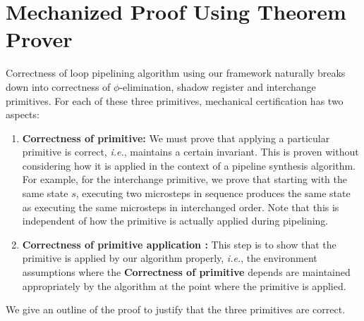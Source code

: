 \section{Mechanized Proof Using Theorem Prover}
\label{sec:proof}

Correctness of loop pipelining algorithm using our framework naturally breaks
down into correctness of $\phi$-elimination, shadow register and interchange primitives. For each of these three primitives, mechanical certification has two aspects:

\begin{enumerate}
\item {\bf Correctness of primitive:} We must prove that
  applying a particular primitive is correct, {\em i.e.},
  maintains a certain invariant.  This is proven without
  considering how it is applied in the context of a pipeline
  synthesis algorithm.  For example, for the interchange
  primitive, we prove that starting with the same state $s$,
  executing two microsteps in sequence produces the same
  state as executing the same microsteps in interchanged
  order.  Note that this is independent of how the primitive
  is actually applied during pipelining.
 
\item {\bf Correctness of primitive application :} This
  step is to show that the primitive is applied by our
  algorithm properly, {\em i.e.}, the environment
  assumptions where the {\bf Correctness of primitive}
  depends are maintained appropriately by the algorithm at
  the point where the primitive is applied.  

\end{enumerate}

\medskip
{} We give an outline of the proof to justify that the three primitives are correct.

